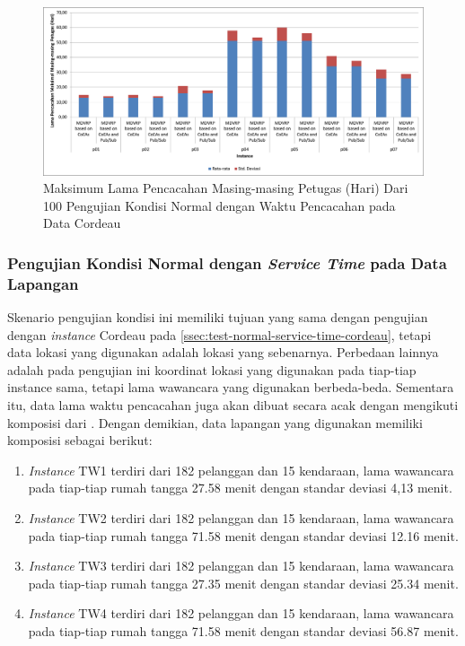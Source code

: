 \begin{figure}[!]
	\centering
	\includegraphics[width=\textwidth]{Resources/Images/test_result_cordeau_tw_mean_stdev_of_total_time}
	\captionsetup{format=hang}
	\caption{Maksimum Lama Pencacahan Masing-masing Petugas (Hari) Dari 100 Pengujian Kondisi Normal dengan Waktu Pencacahan pada Data Cordeau}
	\label{fig:test_result_cordeau_tw_mean_stdev_of_total_time}
\end{figure}


\subsubsection{Pengujian Kondisi Normal dengan \textit{Service Time} pada Data Lapangan}
\label{ssec:test-normal-service-time-field}
Skenario pengujian kondisi ini memiliki tujuan yang sama dengan pengujian dengan \textit{instance} Cordeau pada \autoref{ssec:test-normal-service-time-cordeau}, tetapi data lokasi yang digunakan adalah lokasi yang sebenarnya. Perbedaan lainnya adalah pada pengujian ini koordinat lokasi yang digunakan pada tiap-tiap instance sama, tetapi lama wawancara yang digunakan berbeda-beda. Sementara itu, data lama waktu pencacahan juga akan dibuat secara acak dengan mengikuti komposisi dari \citep{sudman_time_1965}. Dengan demikian, data lapangan yang digunakan memiliki komposisi sebagai berikut:
\begin{enumerate}
	\item \textit{Instance} TW1 terdiri dari 182 pelanggan dan 15 kendaraan, lama wawancara pada tiap-tiap rumah tangga 27.58 menit dengan standar deviasi 4,13 menit.
	\item \textit{Instance} TW2 terdiri dari 182 pelanggan dan 15 kendaraan, lama wawancara pada tiap-tiap rumah tangga 71.58 menit dengan standar deviasi 12.16 menit.
	\item \textit{Instance} TW3 terdiri dari 182 pelanggan dan 15 kendaraan, lama wawancara pada tiap-tiap rumah tangga 27.35 menit dengan standar deviasi 25.34 menit.
	\item \textit{Instance} TW4 terdiri dari 182 pelanggan dan 15 kendaraan, lama wawancara pada tiap-tiap rumah tangga 71.58 menit dengan standar deviasi 56.87 menit.
\end{enumerate}



